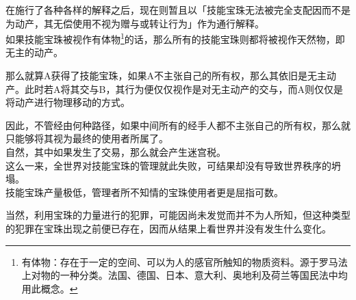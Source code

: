 在施行了各种各样的解释之后，现在则暂且以「技能宝珠无法被完全支配因而不是为动产，其无偿使用不视为赠与或转让行为」作为通行解释。\\

如果技能宝珠被视作有体物\footnote{有体物：存在于一定的空间、可以为人的感官所触知的物质资料。源于罗马法上对物的一种分类。法国、德国、日本、意大利、奥地利及荷兰等国民法中均用此概念。}的话，那么所有的技能宝珠则都将被视作天然物，即无主的动产。

那么就算A获得了技能宝珠，如果A不主张自己的所有权，那么其依旧是无主动产。此时若A将其交与B，其行为便仅仅视作是对无主动产的交与，而A则仅仅是将动产进行物理移动的方式。

因此，不管经由何种路径，如果中间所有的经手人都不主张自己的所有权，那么就只能够将其视为最终的使用者所属了。\\

自然，其中如果发生了交易，那么就会产生迷宫税。\\

这么一来，全世界对技能宝珠的管理就此失败，可结果却没有导致世界秩序的坍塌。\\

技能宝珠产量极低，管理者所不知情的宝珠使用者更是屈指可数。

当然，利用宝珠的力量进行的犯罪，可能因尚未发觉而并不为人所知，但这种类型的犯罪在宝珠出现之前便已存在，因而从结果上看世界并没有发生什么变化。\\

